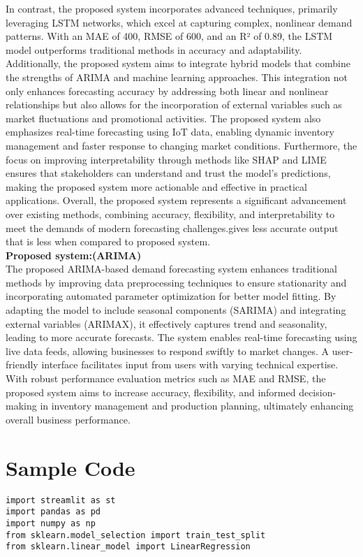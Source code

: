 \documentclass[10pt]{report}
\begin{document}
\begin{center}
In contrast, the proposed system incorporates advanced techniques, primarily leveraging LSTM networks, which excel at capturing complex, nonlinear demand patterns. With an MAE of 400, RMSE of 600, and an R² of 0.89, the LSTM model outperforms traditional methods in accuracy and adaptability. Additionally, the proposed system aims to integrate hybrid models that combine the strengths of ARIMA and machine learning approaches. This integration not only enhances forecasting accuracy by addressing both linear and nonlinear relationships but also allows for the incorporation of external variables such as market fluctuations and promotional activities. The proposed system also emphasizes real-time forecasting using IoT data, enabling dynamic inventory management and faster response to changing market conditions. Furthermore, the focus on improving interpretability through methods like SHAP and LIME ensures that stakeholders can understand and trust the model's predictions, making the proposed system more actionable and effective in practical applications. Overall, the proposed system represents a significant advancement over existing methods, combining accuracy, flexibility, and interpretability to meet the demands of modern forecasting challenges.gives less accurate output that is less when compared to proposed system.\\

\textbf{Proposed system:(ARIMA)}\\ The proposed ARIMA-based demand forecasting system enhances traditional methods by improving data preprocessing techniques to ensure stationarity and incorporating automated parameter optimization for better model fitting. By adapting the model to include seasonal components (SARIMA) and integrating external variables (ARIMAX), it effectively captures trend and seasonality, leading to more accurate forecasts. The system enables real-time forecasting using live data feeds, allowing businesses to respond swiftly to market changes. A user-friendly interface facilitates input from users with varying technical expertise. With robust performance evaluation metrics such as MAE and RMSE, the proposed system aims to increase accuracy, flexibility, and informed decision-making in inventory management and production planning, ultimately enhancing overall business performance.
\newpage
\section{Sample Code}
\begin{lstlisting}
import streamlit as st
import pandas as pd
import numpy as np
from sklearn.model_selection import train_test_split
from sklearn.linear_model import LinearRegression


\end{lstlisting}
\end{center}
\end{document}
